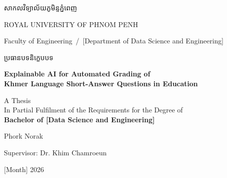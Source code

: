 \begin{titlepage}
\centering
\thispagestyle{empty}

{\khmertitlefont\fontsize{16}{19}\selectfont សាកលវិទ្យាល័យភូមិន្ទភ្នំពេញ\par}
\vspace{0.2cm}
{\large ROYAL UNIVERSITY OF PHNOM PENH\par}
\vspace{0.4cm}
{\normalsize Faculty of Engineering \,/\, [Department of Data Science and Engineering]\par}

\vfill

{\khmertitlefont\large ប្រធានបទនិក្ខេបបទ\par}
\vspace{0.3cm}
{\Large\bfseries Explainable AI for Automated Grading of\\[2pt]
Khmer Language Short-Answer Questions in Education\par}

\vspace{1.0cm}
{\normalsize A Thesis\\
In Partial Fulfilment of the Requirements for the Degree of\\
\textbf{Bachelor of [Data Science and Engineering]}\par}

\vfill

{\large Phork Norak\par}
\vspace{0.2cm}
{\normalsize Supervisor: Dr. Khim Chamroeun\par}

\vspace{0.8cm}
{\normalsize [Month] 2026\par}

\end{titlepage}
\clearpage
